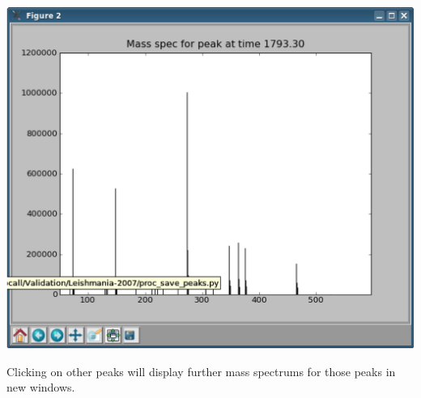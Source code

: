 \begin{center}
\includegraphics[scale=0.33]{graphics/chapter07/test-71-spec.eps}
\end{center}

Clicking on other peaks will display further mass spectrums for those peaks in new windows.
